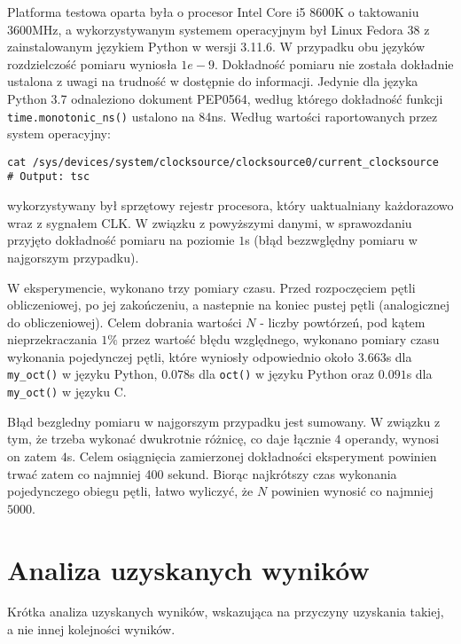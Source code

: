 \documentclass[11pt]{article}
\begin{document}
		Platforma testowa oparta była o procesor Intel Core i5 8600K o taktowaniu 3600MHz, 
		a wykorzystywanym systemem operacyjnym był Linux Fedora 38 z zainstalowanym językiem Python w wersji 3.11.6. 
		W przypadku obu języków rozdzielczość pomiaru wyniosła $1e-9$.
		Dokładność pomiaru nie została dokładnie ustalona z uwagi na trudność w dostępnie do informacji.
		Jedynie dla języka Python 3.7 odnaleziono dokument PEP0564, według którego dokładność funkcji \texttt{time.monotonic\_ns()} ustalono na 84ns.
		Według wartości raportowanych przez system operacyjny:
		\begin{lstlisting}
cat /sys/devices/system/clocksource/clocksource0/current_clocksource
# Output: tsc
		\end{lstlisting}
		wykorzystywany był sprzętowy rejestr procesora, który uaktualniany każdorazowo wraz z sygnałem CLK.
		W związku z powyższymi danymi, w sprawozdaniu przyjęto dokładność pomiaru na poziomie $1$s (błąd bezzwględny pomiaru w najgorszym przypadku).
		
		W eksperymencie, wykonano trzy pomiary czasu. Przed rozpoczęciem pętli obliczeniowej, po jej zakończeniu, a nastepnie na koniec pustej pętli (analogicznej do obliczeniowej).
		Celem dobrania wartości $N$ - liczby powtórzeń, pod kątem nieprzekraczania $1\%$ przez wartość błędu względnego, wykonano pomiary czasu wykonania pojedynczej pętli, 
		które wyniosły odpowiednio około $3.663$s dla \texttt{my\_oct()} w języku Python, $0.078$s dla \texttt{oct()} w języku Python oraz $0.091$s dla \texttt{my\_oct()} w języku C.

		Błąd bezgledny pomiaru w najgorszym przypadku jest sumowany. W związku z tym, że trzeba wykonać dwukrotnie różnicę, co daje łącznie $4$ operandy, wynosi on zatem $4$s.
		Celem osiągnięcia zamierzonej dokładności eksperyment powinien trwać zatem co najmniej 400 sekund. Biorąc najkrótszy czas wykonania pojedynczego obiegu pętli, łatwo wyliczyć, 
		że $N$ powinien wynosić co najmniej $5000$.
		
	
	\section{Analiza uzyskanych wyników}
	Krótka analiza uzyskanych wyników, wskazująca na przyczyny uzyskania takiej, a nie innej kolejności wyników.
\end{document}
